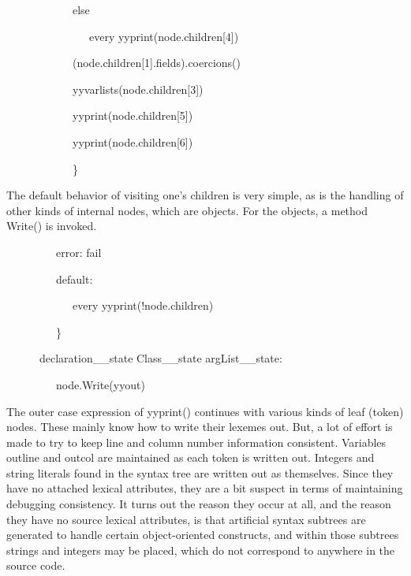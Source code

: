 {\ttfamily\mdseries
\ \ \ \ \ \ \ \ \ \ \ \ else}

{\ttfamily\mdseries
\ \ \ \ \ \ \ \ \ \ \ \ \ \ \ every yyprint(node.children[4])}

{\ttfamily\mdseries
\ \ \ \ \ \ \ \ \ \ \ \ (node.children[1].fields).coercions()}

{\ttfamily\mdseries
\ \ \ \ \ \ \ \ \ \ \ \ yyvarlists(node.children[3])}

{\ttfamily\mdseries
\ \ \ \ \ \ \ \ \ \ \ \ yyprint(node.children[5])}

{\ttfamily\mdseries
\ \ \ \ \ \ \ \ \ \ \ \ yyprint(node.children[6])}

{\ttfamily\mdseries
\ \ \ \ \ \ \ \ \ \ \ \ \}}

The default behavior of visiting one's children is very simple, as is
the handling of other kinds of internal nodes, which are objects. For
the objects, a method Write() is invoked.

{\ttfamily\mdseries
\ \ \ \ \ \ \ \ \ {\textquotedbl}error{\textquotedbl}: fail}

{\ttfamily\mdseries
\ \ \ \ \ \ \ \ \ default:}

{\ttfamily\mdseries
\ \ \ \ \ \ \ \ \ \ \ \ every yyprint(!node.children)}

{\ttfamily\mdseries
\ \ \ \ \ \ \ \ \ \}}

{\ttfamily\mdseries
\ \ \ \ \ \ {\textquotedbl}declaration\_\_state{\textquotedbl} {\textbar} {\textquotedbl}Class\_\_state{\textquotedbl}
{\textbar} {\textquotedbl}argList\_\_state{\textquotedbl}:}

{\ttfamily\mdseries
\ \ \ \ \ \ \ \ \ node.Write(yyout)}


The outer case expression of yyprint() continues with various kinds of
leaf (token) nodes. These mainly know how to write their lexemes
out. But, a lot of effort is made to try to keep line and column
number information consistent.  Variables outline and outcol are
maintained as each token is written out. Integers and string literals
found in the syntax tree are written out as themselves. Since they
have no attached lexical attributes, they are a bit suspect in terms
of maintaining debugging consistency. It turns out the reason they
occur at all, and the reason they have no source lexical attributes,
is that artificial syntax subtrees are generated to handle certain
object-oriented constructs, and within those subtrees strings and
integers may be placed, which do not correspond to anywhere in the
source code.

